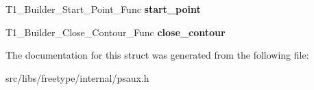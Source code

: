 \begin{DoxyCompactItemize}
\item 
\hypertarget{struct_t1___builder___funcs_rec___ab4897186c65875b4312d4ef68aad9d02}{
T1\_\-Builder\_\-Start\_\-Point\_\-Func {\bfseries start\_\-point}}
\label{struct_t1___builder___funcs_rec___ab4897186c65875b4312d4ef68aad9d02}

\item 
\hypertarget{struct_t1___builder___funcs_rec___abe163896432cc768719bf87cef0d1266}{
T1\_\-Builder\_\-Close\_\-Contour\_\-Func {\bfseries close\_\-contour}}
\label{struct_t1___builder___funcs_rec___abe163896432cc768719bf87cef0d1266}

\end{DoxyCompactItemize}


The documentation for this struct was generated from the following file:\begin{DoxyCompactItemize}
\item 
src/libs/freetype/internal/psaux.h\end{DoxyCompactItemize}
